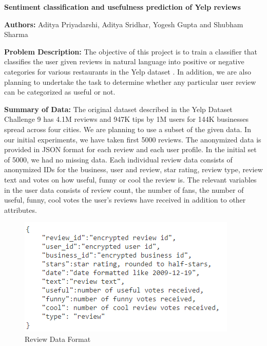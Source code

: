 \documentclass[11pt]{article}
\begin{document}
	\thispagestyle{empty}
	
	
	\centerline{\textbf{\Large{Sentiment classification and usefulness prediction of Yelp reviews}}}
	
	\bigskip
	
	\noindent \textbf{Authors:} 
	Aditya Priyadarshi, Aditya Sridhar, Yogesh Gupta and Shubham Sharma
	
	\bigskip
	
	\noindent \textbf{Problem Description:} 
	The objective of this project is to train a classifier that classifies the user given reviews in natural language into positive or negative categories for various restaurants in the Yelp dataset \cite{yelp}. In addition, we are also planning to undertake the task to determine whether any particular user review can be categorized as useful or not.
	
	\bigskip 
	
	\noindent \textbf{Summary of Data:} 
	The original dataset described in the Yelp Dataset Challenge 9 \cite{yelp} has 4.1M reviews and 947K tips by 1M users for 144K businesses spread across four cities. We are planning to use a subset of the given data. In our initial experiments, we have taken first 5000 reviews. The anonymized data is provided in JSON format for each review and each user profile. In the initial set of 5000, we had no missing data. Each individual review data consists of anonymized IDs for the business, user and review, star rating, review type, review text and votes on how useful, funny or cool the review is. The relevant variables in the user data consists of review count, the number of fans, the number of useful, funny, cool votes the user’s reviews have received in addition to other attributes.
	\begin{figure}[h]
		\centering
		\includegraphics[]{data_format.png}
		\caption{Review Data Format}
	\end{figure}
	
	
	\bigskip
	
\end{document}
